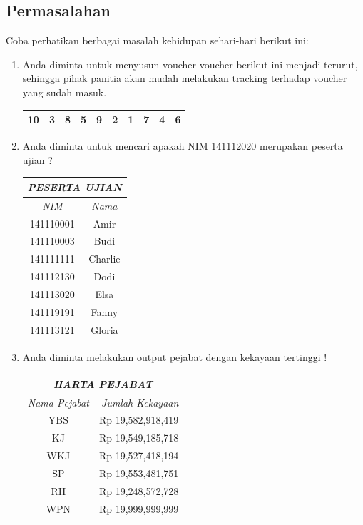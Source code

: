 \subsection{Permasalahan}
Coba perhatikan berbagai masalah kehidupan sehari-hari berikut ini:

\begin{enumerate}
	\item Anda diminta untuk menyusun voucher-voucher berikut ini menjadi terurut, sehingga pihak panitia akan mudah melakukan tracking terhadap voucher yang sudah masuk.  
	
\begin{center} \large
  \begin{tabular}[h!]{| c | c | c | c | c | c | c | c | c | c | }
	\hline
    10 & 3 & 8 & 5 & 9 & 2 & 1 &  7 & 4 & 6 \\
	\hline
  \end{tabular}
\end{center}

	\item Anda diminta untuk mencari apakah NIM 141112020 merupakan peserta ujian ? 
		\large
			\begin{center}
				\begin{tabular}[h!]{| c | c |}
				\hline
				\multicolumn{2}{|c|}{\textit{PESERTA UJIAN}} \\
				\hline	
				\textit{NIM} & \textit{Nama} \\ \hline
				141110001 & Amir \\ \hline
				141110003 & Budi \\ \hline
				141111111 & Charlie \\ \hline
				141112130 & Dodi \\ \hline
				141113020 & Elsa \\ \hline
				141119191 & Fanny \\ \hline
				141113121 & Gloria \\ 
				\hline
				\end{tabular}
		\end{center}
		
	\item Anda diminta melakukan output pejabat dengan kekayaan tertinggi !
			\begin{center}
				\begin{tabular}[h!]{| c | r |}
				\hline
				\multicolumn{2}{|c|}{\textit{HARTA PEJABAT}} \\
				\hline	
				\textit{Nama Pejabat } & \textit{Jumlah Kekayaan} \\ \hline
				YBS & Rp 19,582,918,419 \\ \hline
				KJ & Rp 19,549,185,718 \\ \hline
				WKJ & Rp 19,527,418,194 \\ \hline
				SP & Rp 19,553,481,751 \\ \hline
				RH & Rp 19,248,572,728 \\ \hline
				WPN & Rp 19,999,999,999 \\
				\hline
				\end{tabular}
		\end{center}
		
\end{enumerate}

